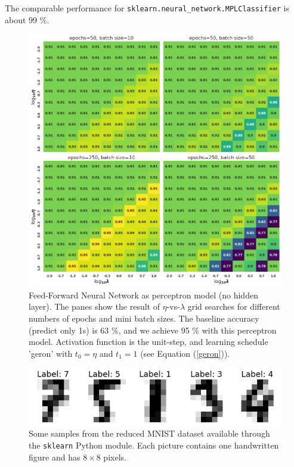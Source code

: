 \documentclass[]{article}
\begin{document}
The comparable performance for \lstinline|sklearn.neural_network.MPLClassifier| is about 99 \%.

\begin{figure}[!htb]
	\centering
	\includegraphics[width=1\linewidth]{ffnn_breast_cancer.png}
	\caption{Feed-Forward Neural Network as perceptron model (no hidden layer). The panes show the result of $\eta$-vs-$\lambda$ grid searches for different numbers of epochs and mini batch sizes. The baseline accuracy (predict only 1s) is 63 \%, and we achieve 95 \% with this perceptron model. Activation function is the unit-step, and learning schedule 'geron' with $t_0 = \eta$ and $t_1 = 1$ (see Equation (\ref{geron})).}
	\label{fig:ffnn_breast_cancer}
\end{figure}


\begin{figure}[!htb]
	\centering
	\includegraphics[width=1\linewidth]{mnist_digits.png}
	\caption{Some samples from the reduced MNIST dataset available through the \lstinline|sklearn| Python module. Each picture contains one handwritten figure and has $8 \times 8$ pixels.}
	\label{fig:mnist_digits}
\end{figure}
\end{document}
